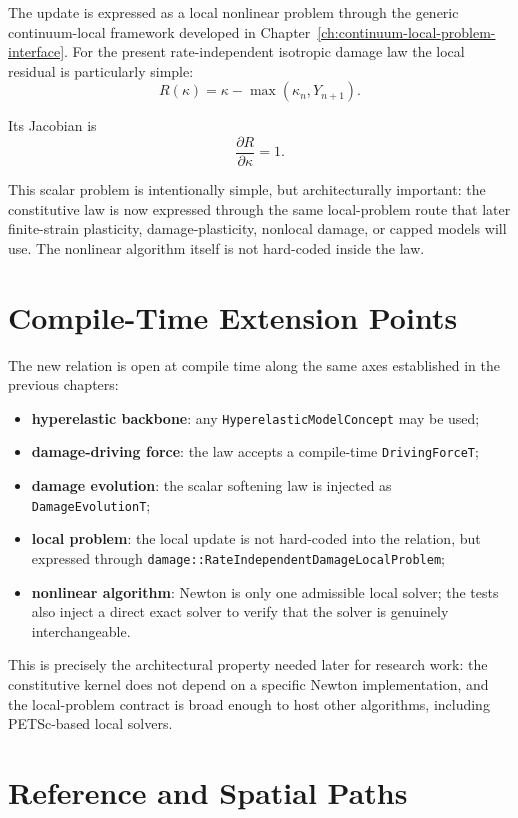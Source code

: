 The update is expressed as a local nonlinear problem through the generic
continuum-local framework developed in Chapter~\ref{ch:continuum-local-problem-interface}.
For the present rate-independent isotropic damage law the local residual is
particularly simple:
\[
  R(\kappa) = \kappa - \max(\kappa_n, Y_{n+1}).
\]

Its Jacobian is
\[
  \frac{\partial R}{\partial \kappa} = 1.
\]

This scalar problem is intentionally simple, but architecturally important:
the constitutive law is now expressed through the same local-problem route that
later finite-strain plasticity, damage-plasticity, nonlocal damage, or capped
models will use.  The nonlinear algorithm itself is not hard-coded inside the
law.

\section{Compile-Time Extension Points}

The new relation is open at compile time along the same axes established in the
previous chapters:
\begin{itemize}
  \item \textbf{hyperelastic backbone}: any
        \texttt{HyperelasticModelConcept} may be used;
  \item \textbf{damage-driving force}: the law accepts a compile-time
        \texttt{DrivingForceT};
  \item \textbf{damage evolution}: the scalar softening law is injected as
        \texttt{DamageEvolutionT};
  \item \textbf{local problem}: the local update is not hard-coded into the
        relation, but expressed through
        \texttt{damage::RateIndependentDamageLocalProblem};
  \item \textbf{nonlinear algorithm}: Newton is only one admissible local
        solver; the tests also inject a direct exact solver to verify that the
        solver is genuinely interchangeable.
\end{itemize}

This is precisely the architectural property needed later for research work:
the constitutive kernel does not depend on a specific Newton implementation,
and the local-problem contract is broad enough to host other algorithms,
including PETSc-based local solvers.

\section{Reference and Spatial Paths}

